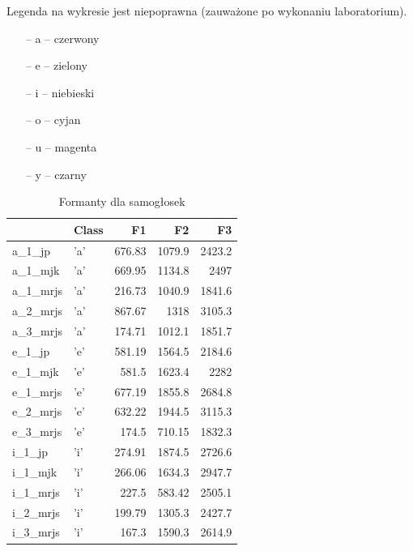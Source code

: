 \documentclass[a4paper, 12pt, titlepage]{article}
\begin{document}
        Legenda na wykresie jest niepoprawna (zauważone po wykonaniu
        laboratorium).
        \begin{itemize}
            \item[--] a -- czerwony
            \item[--] e -- zielony
            \item[--] i -- niebieski
            \item[--] o -- cyjan
            \item[--] u -- magenta
            \item[--] y -- czarny
        \end{itemize}
        \begin{table}[H]
            \centering
            \caption{Formanty dla samogłosek}
            \begin{tabular}{|l|l|r|r|r|}
                \hline
                 & Class & F1 & F2 & F3 \\ \hline 
                a\_1\_jp & 'a' & 676.83 & 1079.9 & 2423.2 \\ \hline
                a\_1\_mjk & 'a' & 669.95 & 1134.8 & 2497 \\ \hline
                a\_1\_mrjs & 'a' & 216.73 & 1040.9 & 1841.6 \\ \hline
                a\_2\_mrjs & 'a' & 867.67 & 1318 & 3105.3 \\ \hline
                a\_3\_mrjs & 'a' & 174.71 & 1012.1 & 1851.7 \\ \hline
                e\_1\_jp & 'e' & 581.19 & 1564.5 & 2184.6 \\ \hline
                e\_1\_mjk & 'e' & 581.5 & 1623.4 & 2282 \\ \hline
                e\_1\_mrjs & 'e' & 677.19 & 1855.8 & 2684.8 \\ \hline
                e\_2\_mrjs & 'e' & 632.22 & 1944.5 & 3115.3 \\ \hline
                e\_3\_mrjs & 'e' & 174.5 & 710.15 & 1832.3 \\ \hline
                i\_1\_jp & 'i' & 274.91 & 1874.5 & 2726.6 \\ \hline
                i\_1\_mjk & 'i' & 266.06 & 1634.3 & 2947.7 \\ \hline
                i\_1\_mrjs & 'i' & 227.5 & 583.42 & 2505.1 \\ \hline
                i\_2\_mrjs & 'i' & 199.79 & 1305.3 & 2427.7 \\ \hline
                i\_3\_mrjs & 'i' & 167.3 & 1590.3 & 2614.9 \\ \hline

\end{tabular}
\end{table}
\end{document}

